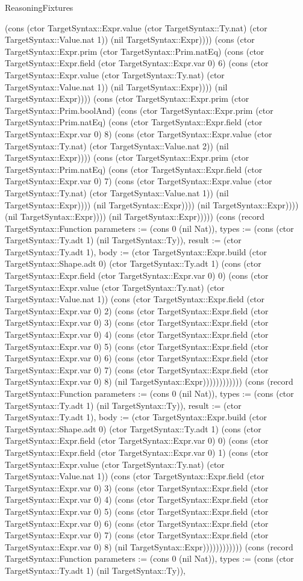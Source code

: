 \begin{lexlean}{ReasoningFixtures}
\begin{semanticmodule}
{(cons (ctor TargetSyntax::Expr.value (ctor TargetSyntax::Ty.nat) (ctor TargetSyntax::Value.nat 1)) (nil TargetSyntax::Expr)))) (cons (ctor TargetSyntax::Expr.prim (ctor TargetSyntax::Prim.natEq) (cons (ctor TargetSyntax::Expr.field (ctor TargetSyntax::Expr.var 0) 6) (cons (ctor TargetSyntax::Expr.value (ctor TargetSyntax::Ty.nat) (ctor TargetSyntax::Value.nat 1)) (nil TargetSyntax::Expr)))) (nil TargetSyntax::Expr)))) (cons (ctor TargetSyntax::Expr.prim (ctor TargetSyntax::Prim.boolAnd) (cons (ctor TargetSyntax::Expr.prim (ctor TargetSyntax::Prim.natEq) (cons (ctor TargetSyntax::Expr.field (ctor TargetSyntax::Expr.var 0) 8) (cons (ctor TargetSyntax::Expr.value (ctor TargetSyntax::Ty.nat) (ctor TargetSyntax::Value.nat 2)) (nil TargetSyntax::Expr)))) (cons (ctor TargetSyntax::Expr.prim (ctor TargetSyntax::Prim.natEq) (cons (ctor TargetSyntax::Expr.field (ctor TargetSyntax::Expr.var 0) 7) (cons (ctor TargetSyntax::Expr.value (ctor TargetSyntax::Ty.nat) (ctor TargetSyntax::Value.nat 1)) (nil TargetSyntax::Expr)))) (nil TargetSyntax::Expr)))) (nil TargetSyntax::Expr)))) (nil TargetSyntax::Expr)))) (nil TargetSyntax::Expr))))}) (cons (record TargetSyntax::Function {parameters := (cons 0 (nil Nat)), types := (cons (ctor TargetSyntax::Ty.adt 1) (nil TargetSyntax::Ty)), result := (ctor TargetSyntax::Ty.adt 1), body := (ctor TargetSyntax::Expr.build (ctor TargetSyntax::Shape.adt 0) (ctor TargetSyntax::Ty.adt 1) (cons (ctor TargetSyntax::Expr.field (ctor TargetSyntax::Expr.var 0) 0) (cons (ctor TargetSyntax::Expr.value (ctor TargetSyntax::Ty.nat) (ctor TargetSyntax::Value.nat 1)) (cons (ctor TargetSyntax::Expr.field (ctor TargetSyntax::Expr.var 0) 2) (cons (ctor TargetSyntax::Expr.field (ctor TargetSyntax::Expr.var 0) 3) (cons (ctor TargetSyntax::Expr.field (ctor TargetSyntax::Expr.var 0) 4) (cons (ctor TargetSyntax::Expr.field (ctor TargetSyntax::Expr.var 0) 5) (cons (ctor TargetSyntax::Expr.field (ctor TargetSyntax::Expr.var 0) 6) (cons (ctor TargetSyntax::Expr.field (ctor TargetSyntax::Expr.var 0) 7) (cons (ctor TargetSyntax::Expr.field (ctor TargetSyntax::Expr.var 0) 8) (nil TargetSyntax::Expr)))))))))))}) (cons (record TargetSyntax::Function {parameters := (cons 0 (nil Nat)), types := (cons (ctor TargetSyntax::Ty.adt 1) (nil TargetSyntax::Ty)), result := (ctor TargetSyntax::Ty.adt 1), body := (ctor TargetSyntax::Expr.build (ctor TargetSyntax::Shape.adt 0) (ctor TargetSyntax::Ty.adt 1) (cons (ctor TargetSyntax::Expr.field (ctor TargetSyntax::Expr.var 0) 0) (cons (ctor TargetSyntax::Expr.field (ctor TargetSyntax::Expr.var 0) 1) (cons (ctor TargetSyntax::Expr.value (ctor TargetSyntax::Ty.nat) (ctor TargetSyntax::Value.nat 1)) (cons (ctor TargetSyntax::Expr.field (ctor TargetSyntax::Expr.var 0) 3) (cons (ctor TargetSyntax::Expr.field (ctor TargetSyntax::Expr.var 0) 4) (cons (ctor TargetSyntax::Expr.field (ctor TargetSyntax::Expr.var 0) 5) (cons (ctor TargetSyntax::Expr.field (ctor TargetSyntax::Expr.var 0) 6) (cons (ctor TargetSyntax::Expr.field (ctor TargetSyntax::Expr.var 0) 7) (cons (ctor TargetSyntax::Expr.field (ctor TargetSyntax::Expr.var 0) 8) (nil TargetSyntax::Expr)))))))))))}) (cons (record TargetSyntax::Function {parameters := (cons 0 (nil Nat)), types := (cons (ctor TargetSyntax::Ty.adt 1) (nil TargetSyntax::Ty)), }
\end{semanticmodule}
\end{lexlean}
